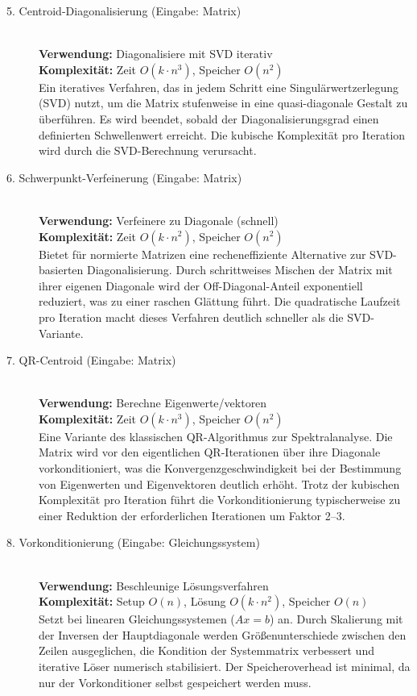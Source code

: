 \documentclass[a4paper,12pt]{article}
\begin{document}
\begin{description}
    \item[5. Centroid-Diagonalisierung (Eingabe: Matrix)] \hfill \\
    \textbf{Verwendung:} Diagonalisiere mit SVD iterativ \\
    \textbf{Komplexität:} Zeit $O(k \cdot n^3)$, Speicher $O(n^2)$ \\
    Ein iteratives Verfahren, das in jedem Schritt eine Singulärwertzerlegung (SVD) nutzt, um die Matrix stufenweise in eine quasi-diagonale Gestalt zu überführen. Es wird beendet, sobald der Diagonalisierungsgrad einen definierten Schwellenwert erreicht. Die kubische Komplexität pro Iteration wird durch die SVD-Berechnung verursacht.

    \item[6. Schwerpunkt-Verfeinerung (Eingabe: Matrix)] \hfill \\
    \textbf{Verwendung:} Verfeinere zu Diagonale (schnell) \\
    \textbf{Komplexität:} Zeit $O(k \cdot n^2)$, Speicher $O(n^2)$ \\
    Bietet für normierte Matrizen eine recheneffiziente Alternative zur SVD-basierten Diagonalisierung. Durch schrittweises Mischen der Matrix mit ihrer eigenen Diagonale wird der Off-Diagonal-Anteil exponentiell reduziert, was zu einer raschen Glättung führt. Die quadratische Laufzeit pro Iteration macht dieses Verfahren deutlich schneller als die SVD-Variante.

    \item[7. QR-Centroid (Eingabe: Matrix)] \hfill \\
    \textbf{Verwendung:} Berechne Eigenwerte/vektoren \\
    \textbf{Komplexität:} Zeit $O(k \cdot n^3)$, Speicher $O(n^2)$ \\
    Eine Variante des klassischen QR-Algorithmus zur Spektralanalyse. Die Matrix wird vor den eigentlichen QR-Iterationen über ihre Diagonale vorkonditioniert, was die Konvergenzgeschwindigkeit bei der Bestimmung von Eigenwerten und Eigenvektoren deutlich erhöht. Trotz der kubischen Komplexität pro Iteration führt die Vorkonditionierung typischerweise zu einer Reduktion der erforderlichen Iterationen um Faktor 2--3.

    \item[8. Vorkonditionierung (Eingabe: Gleichungssystem)] \hfill \\
    \textbf{Verwendung:} Beschleunige Lösungsverfahren \\
    \textbf{Komplexität:} Setup $O(n)$, Lösung $O(k \cdot n^2)$, Speicher $O(n)$ \\
    Setzt bei linearen Gleichungssystemen ($Ax = b$) an. Durch Skalierung mit der Inversen der Hauptdiagonale werden Größenunterschiede zwischen den Zeilen ausgeglichen, die Kondition der Systemmatrix verbessert und iterative Löser numerisch stabilisiert. Der Speicheroverhead ist minimal, da nur der Vorkonditioner selbst gespeichert werden muss.


\end{description}
\end{document}
